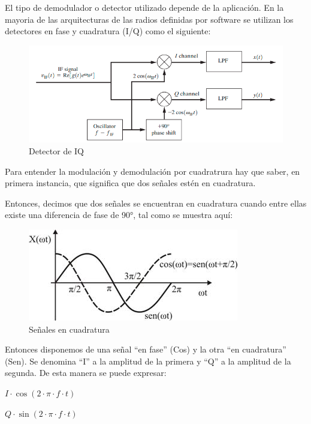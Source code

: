\documentclass[a4paper,12pt]{report} %
\begin{document}
El tipo de demodulador o detector utilizado depende de la aplicación. En la mayoria de las arquitecturas de las radios definidas por software se utilizan los detectores en fase y cuadratura (I/Q) como el siguiente: 

\begin{figure}[H]
	\centering
	\includegraphics[scale=0.6]{Imagenes/Arquitectura/iq}
	\caption{Detector de IQ}
	\label{iq}
\end{figure}


Para entender la modulación y demodulación por cuadratrura hay que saber, en primera instancia, que significa que dos señales estén en cuadratura.

Entonces, decimos que dos señales se encuentran en cuadratura cuando entre ellas existe una diferencia de fase de 90°, tal como se muestra aquí: 

\begin{figure}[H]
	\centering
	\includegraphics[scale=0.8]{Imagenes/Arquitectura/cuadratura}
	\caption{Señales en cuadratura}
	\label{cuad}
\end{figure}

Entonces disponemos de una señal ``en fase'' (Cos) y la otra ``en cuadratura'' (Sen). Se denomina ``I'' a la amplitud de la primera y ``Q'' a la amplitud de la segunda. De esta manera se puede expresar: 

\begin{center}
	$I\cdot\cos(2\cdot\pi\cdot f\cdot t)$
	
	$Q\cdot\sin(2\cdot\pi\cdot f\cdot t)$
\end{center}
\end{document}
